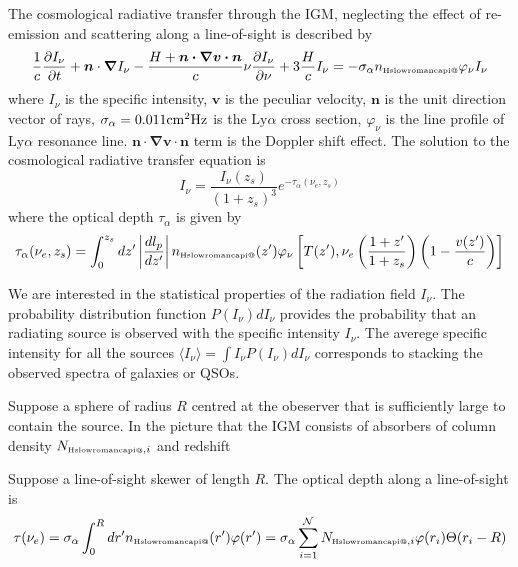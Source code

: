 \documentclass[useAMS,usenatbib,twocolumn]{mn2e}
\makeatletter
\newcommand{\Rmnum}[1]{\expandafter\@slowromancap\romannumeral #1@}
\newcommand{\nHI}{n_{\mbox{\tiny H\Rmnum{1}}}}
\newcommand{\LyA}{\mbox{Ly}\alpha}
\newcommand{\NHIi}{N_{\mbox{\tiny H\Rmnum{1}},i}}
\makeatother
\begin{document}
The cosmological radiative transfer through the IGM, neglecting the effect
of re-emission and scattering along a line-of-sight is described by
\begin{equation}
\frac{1}{c}\frac{\partial I_{\nu}}{\partial t}
+\boldsymbol{n}\cdot\boldsymbol\nabla I_{\nu}
-\frac{H+\boldsymbol{n\cdot\nabla v\cdot n}}{c}
\nu\frac{\partial I_{\nu}}{\partial \nu}+
3\frac{H}{c}I_{\nu}=-\sigma_\alpha\nHI\varphi_\nu I_{\nu}
\end{equation}
where $I_\nu$ is the specific intensity, $\boldsymbol{v}$ is the peculiar 
velocity, $\boldsymbol{n}$ is the unit direction vector of rays, 
$\sigma_\alpha=0.011\rm cm^2Hz$ is the $\LyA$ cross section,
$\varphi_\nu$ is the line profile of $\LyA$ resonance line. 
$\boldsymbol{n\cdot\nabla v\cdot n}$ term is the Doppler shift effect.
The solution to the cosmological radiative transfer equation is
\begin{equation}
I_\nu=\frac{I_\nu(z_s)}{(1+z_s)^3}e^{-\tau_\alpha(\nu_e,z_s)}
\end{equation}
where the optical depth $\tau_\alpha$ is given by
\begin{equation}
\tau_\alpha(\nu_e,z_s)=\int_0^{z_s}dz'\left|\frac{dl_p}{dz'}\right|
\nHI(z')\varphi_\nu\left[T(z'),\nu_e\left(\frac{1+z'}{1+z_s}\right)
\left(1-\frac{v(z')}{c}\right)\right]
\end{equation}
 
We are interested in the statistical properties of the radiation field $I_\nu$.
The probability distribution function $P(I_\nu)dI_\nu$ provides the probability
that an radiating source is observed  with the specific intensity $I_\nu$.
The averege specific intensity for all the sources 
$\langle I_\nu\rangle=\int I_\nu P(I_\nu)dI_\nu$ corresponds to stacking the 
observed spectra of galaxies or QSOs. 

Suppose a sphere of radius $R$ centred at the obeserver that is sufficiently 
large to contain the source. In the picture that the IGM consists of absorbers
of column density $\NHIi$ and redshift


Suppose a line-of-sight skewer of length $R$.
The optical depth along a line-of-sight is
\begin{equation}
\tau(\nu_e)=\sigma_\alpha\int_0^R dr' \nHI(r')\varphi(r')
=\sigma_\alpha\sum_{i=1}^{\mathcal{N}} \NHIi\varphi(r_i) \Theta(r_i-R)
\end{equation}


\label{lastpage}
\end{document}
